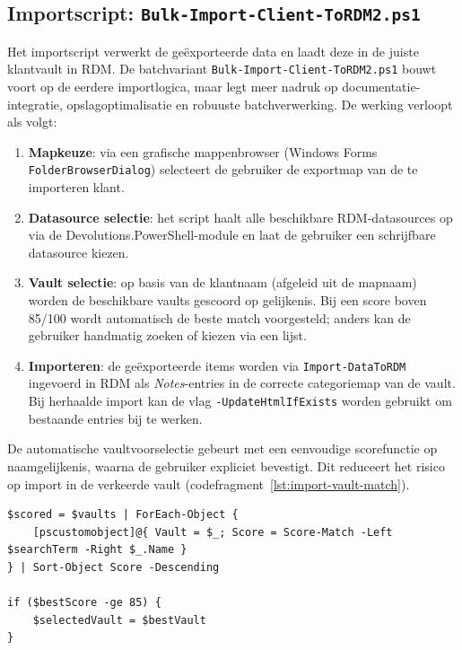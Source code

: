 \subsection{Importscript: \texttt{Bulk-Import-Client-ToRDM2.ps1}}
\label{subsec:importscript}

Het importscript verwerkt de geëxporteerde data en laadt deze in de juiste klantvault in RDM. De batchvariant \texttt{Bulk-Import-Client-ToRDM2.ps1} bouwt voort op de eerdere importlogica, maar legt meer nadruk op documentatie-integratie, opslagoptimalisatie en robuuste batchverwerking. De werking verloopt als volgt:

\begin{enumerate}
    \item \textbf{Mapkeuze}: via een grafische mappenbrowser (Windows Forms \texttt{FolderBrowserDialog}) selecteert de gebruiker de exportmap van de te importeren klant.
    \item \textbf{Datasource selectie}: het script haalt alle beschikbare RDM-datasources op via de Devolutions.PowerShell-module en laat de gebruiker een schrijfbare datasource kiezen.
    \item \textbf{Vault selectie}: op basis van de klantnaam (afgeleid uit de mapnaam) worden de beschikbare vaults gescoord op gelijkenis. Bij een score boven 85/100 wordt automatisch de beste match voorgesteld; anders kan de gebruiker handmatig zoeken of kiezen via een lijst.
    \item \textbf{Importeren}: de geëxporteerde items worden via \texttt{Import-DataToRDM} ingevoerd in RDM als \emph{Notes}-entries in de correcte categoriemap van de vault. Bij herhaalde import kan de vlag \texttt{-UpdateHtmlIfExists} worden gebruikt om bestaande entries bij te werken.
\end{enumerate}

De automatische vaultvoorselectie gebeurt met een eenvoudige scorefunctie op naamgelijkenis, waarna de gebruiker expliciet bevestigt. Dit reduceert het risico op import in de verkeerde vault (codefragment~\ref{lst:import-vault-match}).

\begin{listing}[htbp]
\begin{lstlisting}
$scored = $vaults | ForEach-Object {
    [pscustomobject]@{ Vault = $_; Score = Score-Match -Left $searchTerm -Right $_.Name }
} | Sort-Object Score -Descending

if ($bestScore -ge 85) {
    $selectedVault = $bestVault
}
\end{lstlisting}
\caption{Automatische voorselectie van de RDM-vault op basis van naamscore}
\label{lst:import-vault-match}
\end{listing}

